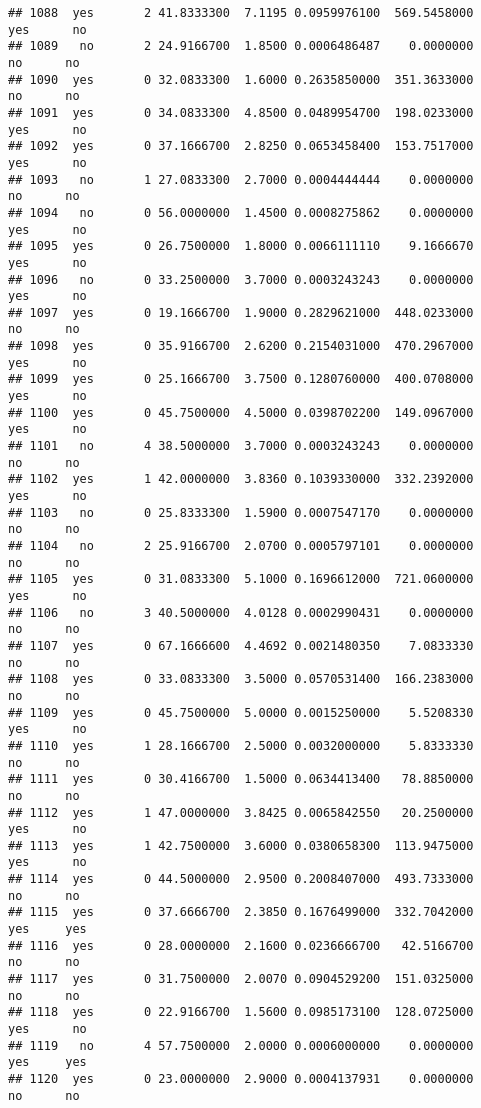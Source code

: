\documentclass[]{article}
\begin{document}
\begin{verbatim}
## 1088  yes       2 41.8333300  7.1195 0.0959976100  569.5458000   yes      no
## 1089   no       2 24.9166700  1.8500 0.0006486487    0.0000000    no      no
## 1090  yes       0 32.0833300  1.6000 0.2635850000  351.3633000    no      no
## 1091  yes       0 34.0833300  4.8500 0.0489954700  198.0233000   yes      no
## 1092  yes       0 37.1666700  2.8250 0.0653458400  153.7517000   yes      no
## 1093   no       1 27.0833300  2.7000 0.0004444444    0.0000000    no      no
## 1094   no       0 56.0000000  1.4500 0.0008275862    0.0000000   yes      no
## 1095  yes       0 26.7500000  1.8000 0.0066111110    9.1666670   yes      no
## 1096   no       0 33.2500000  3.7000 0.0003243243    0.0000000   yes      no
## 1097  yes       0 19.1666700  1.9000 0.2829621000  448.0233000    no      no
## 1098  yes       0 35.9166700  2.6200 0.2154031000  470.2967000   yes      no
## 1099  yes       0 25.1666700  3.7500 0.1280760000  400.0708000   yes      no
## 1100  yes       0 45.7500000  4.5000 0.0398702200  149.0967000   yes      no
## 1101   no       4 38.5000000  3.7000 0.0003243243    0.0000000    no      no
## 1102  yes       1 42.0000000  3.8360 0.1039330000  332.2392000   yes      no
## 1103   no       0 25.8333300  1.5900 0.0007547170    0.0000000    no      no
## 1104   no       2 25.9166700  2.0700 0.0005797101    0.0000000    no      no
## 1105  yes       0 31.0833300  5.1000 0.1696612000  721.0600000   yes      no
## 1106   no       3 40.5000000  4.0128 0.0002990431    0.0000000    no      no
## 1107  yes       0 67.1666600  4.4692 0.0021480350    7.0833330    no      no
## 1108  yes       0 33.0833300  3.5000 0.0570531400  166.2383000    no      no
## 1109  yes       0 45.7500000  5.0000 0.0015250000    5.5208330   yes      no
## 1110  yes       1 28.1666700  2.5000 0.0032000000    5.8333330    no      no
## 1111  yes       0 30.4166700  1.5000 0.0634413400   78.8850000    no      no
## 1112  yes       1 47.0000000  3.8425 0.0065842550   20.2500000   yes      no
## 1113  yes       1 42.7500000  3.6000 0.0380658300  113.9475000   yes      no
## 1114  yes       0 44.5000000  2.9500 0.2008407000  493.7333000    no      no
## 1115  yes       0 37.6666700  2.3850 0.1676499000  332.7042000   yes     yes
## 1116  yes       0 28.0000000  2.1600 0.0236666700   42.5166700    no      no
## 1117  yes       0 31.7500000  2.0070 0.0904529200  151.0325000    no      no
## 1118  yes       0 22.9166700  1.5600 0.0985173100  128.0725000   yes      no
## 1119   no       4 57.7500000  2.0000 0.0006000000    0.0000000   yes     yes
## 1120  yes       0 23.0000000  2.9000 0.0004137931    0.0000000    no      no

\end{verbatim}
\end{document}
